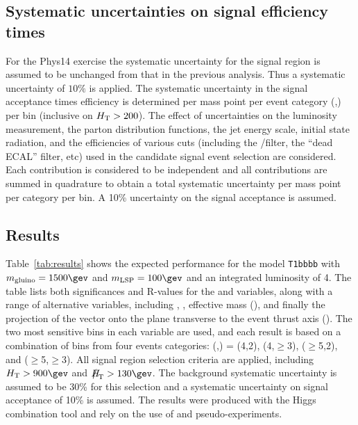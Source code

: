 \subsection{Systematic uncertainties on signal efficiency times}
\label{sec:sig-syst}

For the Phys14 exercise the systematic uncertainty for the signal region 
is assumed to be unchanged from that in the previous analysis. 
Thus a systematic uncertainty of $10\%$ is applied. The systematic 
uncertainty in the signal acceptance times efficiency is determined per mass 
point per event category (\njet,\nb) per
\scalht bin (inclusive on $\mbox{$H_\text{T}$} > 200$). The effect of
uncertainties on the luminosity measurement, the parton distribution
functions, the jet energy scale, initial state radiation, and the
efficiencies of various cuts (including the \mht/\met filter, the
``dead ECAL'' filter, etc)
used in the candidate signal event selection are considered. Each
contribution is considered to be independent and all contributions are
summed in quadrature to obtain a total systematic uncertainty per mass
point per category per \scalht bin. A 10\% uncertainty on the signal
acceptance is assumed. 

\newpage

\subsection{Results}

Table~\ref{tab:results} shows the expected performance for the model
\verb!T1bbbb! with $m_{\rm gluino} = 1500\gev$ and $m_{\rm LSP} =
100\gev$ and an integrated luminosity of 4\fbinv. The table lists both
significances and R-values for the \scalht and \alphat variables,
along with a range of alternative variables, including \mht, \met,
effective mass (\meff), and finally the projection of the \mht vector
onto the plane transverse to the event thrust axis (\mhttt). The two
most sensitive bins in each variable are used, and each result is
based on a combination of bins from four events categories:
(\njet,\nb) = (4,2), (4,$\geq$3), ($\geq$5,2), and
($\geq$5,$\geq$3). All signal region selection criteria are applied,
including $\scalht > 900\gev$ and $\mht > 130\gev$. The background
systematic uncertainty is assumed to be 30\% for this selection and a
systematic uncertainty on signal acceptance of 10\% is assumed. The
results were produced with the Higgs combination tool and rely on the
use of \cls and pseudo-experiments.

